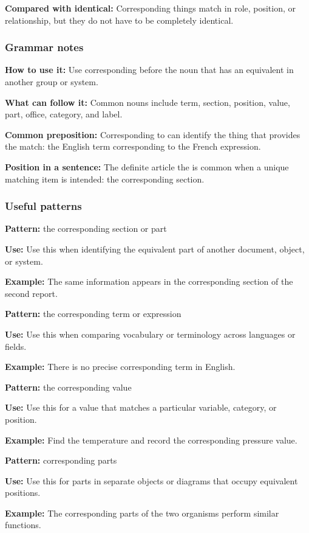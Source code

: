 \documentclass[11pt]{article}
\begin{document}
\textbf{Compared with identical:} Corresponding things match in role, position, or relationship, but they do not have to be completely identical.

\subsubsection{Grammar notes}
\textbf{How to use it:} Use corresponding before the noun that has an equivalent in another group or system.

\textbf{What can follow it:} Common nouns include term, section, position, value, part, office, category, and label.

\textbf{Common preposition:} Corresponding to can identify the thing that provides the match: the English term corresponding to the French expression.

\textbf{Position in a sentence:} The definite article the is common when a unique matching item is intended: the corresponding section.

\subsubsection{Useful patterns}
\textbf{Pattern:} the corresponding section or part

\textbf{Use:} Use this when identifying the equivalent part of another document, object, or system.

\textbf{Example:} The same information appears in the corresponding section of the second report.

\textbf{Pattern:} the corresponding term or expression

\textbf{Use:} Use this when comparing vocabulary or terminology across languages or fields.

\textbf{Example:} There is no precise corresponding term in English.

\textbf{Pattern:} the corresponding value

\textbf{Use:} Use this for a value that matches a particular variable, category, or position.

\textbf{Example:} Find the temperature and record the corresponding pressure value.

\textbf{Pattern:} corresponding parts

\textbf{Use:} Use this for parts in separate objects or diagrams that occupy equivalent positions.

\textbf{Example:} The corresponding parts of the two organisms perform similar functions.
\end{document}
